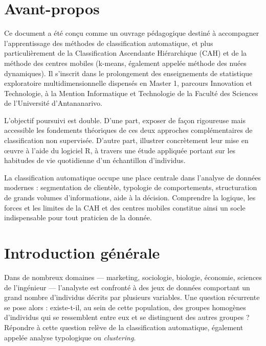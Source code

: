 \documentclass[11pt,a4paper]{report}
\begin{document}
	\tableofcontents
	\clearpage
	\pagestyle{fancy}
	
	\chapter*{Avant-propos}
	
	Ce document a été conçu comme un ouvrage pédagogique destiné à accompagner l'apprentissage des méthodes de classification automatique, et plus particulièrement de la Classification Ascendante Hiérarchique (CAH) et de la méthode des centres mobiles (k-means, également appelée méthode des nuées dynamiques). Il s'inscrit dans le prolongement des enseignements de statistique exploratoire multidimensionnelle dispensés en Master 1, parcours Innovation et Technologie, à la Mention Informatique et Technologie de la Faculté des Sciences de l'Université d'Antananarivo.
	
	L'objectif poursuivi est double. D'une part, exposer de façon rigoureuse mais accessible les fondements théoriques de ces deux approches complémentaires de classification non supervisée. D'autre part, illustrer concrètement leur mise en œuvre à l'aide du logiciel R, à travers une étude appliquée portant sur les habitudes de vie quotidienne d'un échantillon d'individus.
	
	La classification automatique occupe une place centrale dans l'analyse de données modernes : segmentation de clientèle, typologie de comportements, structuration de grands volumes d'informations, aide à la décision. Comprendre la logique, les forces et les limites de la CAH et des centres mobiles constitue ainsi un socle indispensable pour tout praticien de la donnée.
	
	\chapter*{Introduction générale}
	
	Dans de nombreux domaines --- marketing, sociologie, biologie, économie, sciences de l'ingénieur --- l'analyste est confronté à des jeux de données comportant un grand nombre d'individus décrits par plusieurs variables. Une question récurrente se pose alors : existe-t-il, au sein de cette population, des groupes homogènes d'individus qui se ressemblent entre eux et se distinguent des autres groupes ? Répondre à cette question relève de la classification automatique, également appelée analyse typologique ou \emph{clustering}.
	
\end{document}
